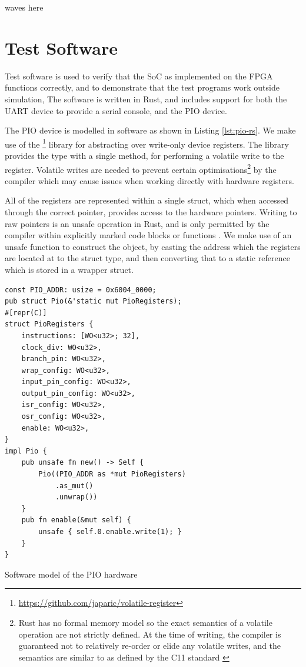 waves here

\section{Test Software}

Test software is used to verify that the SoC as implemented on the FPGA functions correctly, and to demonstrate that the test programs work outside simulation, The software is written in Rust, and includes support for both the UART device to provide a serial console, and the PIO device.

The PIO device is modelled in software as shown in Listing \ref{lst:pio-rs}. We make use of the \footnote{\url{https://github.com/japaric/volatile-register}} library for abstracting over write-only device registers. The library provides the  type with a single method,  for performing a volatile write to the register. Volatile writes are needed to prevent certain optimisations\footnote{Rust has no formal memory model so the exact semantics of a volatile operation are not strictly defined. At the time of writing, the compiler is guaranteed not to relatively re-order or elide any volatile writes, and the semantics are similar to as defined by the C11 standard \cite{rust-pointer, c11}} by the compiler which may cause issues when working directly with hardware registers.

All of the registers are represented within a single struct, which when accessed through the correct pointer, provides access to the hardware pointers. Writing to raw pointers is an unsafe operation in Rust, and is only permitted by the compiler within explicitly marked  code blocks or functions \cite{rust-usability}. We make use of an unsafe function to construct the  object, by casting the address which the registers are located at to the struct type, and then converting that to a static reference which is stored in a wrapper struct.

\begin{listing}[h!]
    \begin{verbatim}
const PIO_ADDR: usize = 0x6004_0000;
pub struct Pio(&'static mut PioRegisters);
#[repr(C)]
struct PioRegisters {
    instructions: [WO<u32>; 32],
    clock_div: WO<u32>,
    branch_pin: WO<u32>,
    wrap_config: WO<u32>,
    input_pin_config: WO<u32>,
    output_pin_config: WO<u32>,
    isr_config: WO<u32>,
    osr_config: WO<u32>,
    enable: WO<u32>,
}
impl Pio {
    pub unsafe fn new() -> Self {
        Pio((PIO_ADDR as *mut PioRegisters)
            .as_mut()
            .unwrap())
    }
    pub fn enable(&mut self) {
        unsafe { self.0.enable.write(1); }
    }
}
    \end{verbatim}
    \caption{Software model of the PIO hardware}
    \label{lst:pio-rs}
\end{listing}

